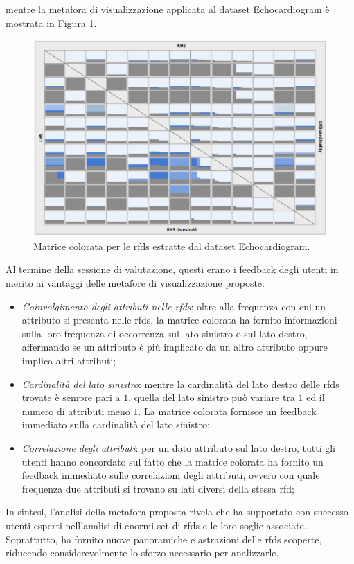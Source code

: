 mentre la metafora di visualizzazione applicata al dataset Echocardiogram \`{e} mostrata in Figura \ref{fig:colored_matrix_echo}.
\begin{figure}[ht]
    \centering
    \includegraphics[width=\linewidth]{capitoli/figure/echo_metaphore}
    \caption{Matrice colorata per le \acrshort{rfds} estratte dal dataset Echocardiogram.}
    \label{fig:colored_matrix_echo}
\end{figure}
Al termine della sessione di valutazione, questi erano i feedback degli utenti in merito ai vantaggi delle metafore di visualizzazione proposte:
\begin{itemize}
    \item \textit{Coinvolgimento degli attributi nelle \acrshort{rfds}}: oltre alla frequenza con cui un attributo si presenta nelle \acrshort{rfds}, la matrice colorata ha fornito informazioni sulla loro frequenza di occorrenza sul lato sinistro o sul lato destro, affermando se un attributo \`{e} pi\`{u} implicato da un altro attributo oppure implica altri attributi;
    \item \textit{Cardinalit\`{a} del lato sinistro}: mentre la cardinalit\`{a} del lato destro delle \acrshort{rfds} trovate \`{e} sempre pari a $1$, quella del lato sinistro pu\`{o} variare tra $1$ ed il numero di attributi meno $1$. La matrice colorata fornisce un feedback immediato sulla cardinalit\`{a} del lato sinistro;
    \item \textit{Correlazione degli attributi}: per un dato attributo sul lato destro, tutti gli utenti hanno concordato sul fatto che la matrice colorata ha fornito un feedback immediato sulle correlazioni degli attributi, ovvero con quale frequenza due attributi si trovano su lati diversi della stessa \acrshort{rfd};
\end{itemize}
In sintesi, l'analisi della metafora proposta rivela che ha supportato con successo utenti esperti nell'analisi di enormi set di \acrshort{rfds} e le loro soglie associate. Soprattutto, ha fornito nuove panoramiche e astrazioni delle \acrshort{rfds} scoperte, riducendo considerevolmente lo sforzo necessario per analizzarle.

